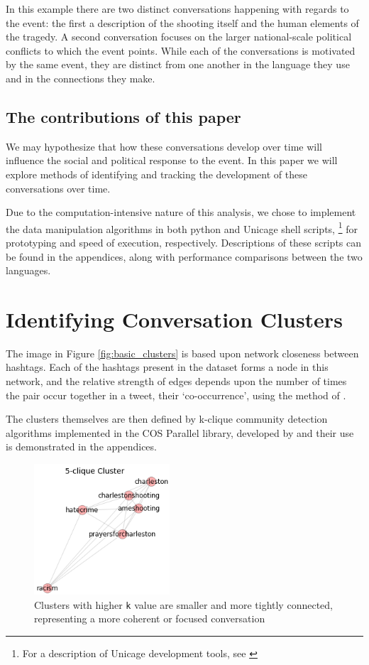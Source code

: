 \documentclass[12pt]{article}
\begin{document}
In this example there are two distinct conversations happening with regards to the event: the first a description of the shooting itself and the human elements of the tragedy. 
A second conversation focuses on the larger national-scale political conflicts to which the event points. 
While each of the conversations is motivated by the same event, they are distinct from one another in the language they use and in the connections they make.

\subsection{The contributions of this paper}
We may hypothesize that how these conversations develop over time will influence the social and political response to the event. 
In this paper we will explore methods of identifying and tracking the development of these conversations over time.

Due to the computation-intensive nature of this analysis, we chose to implement the data manipulation algorithms in both python and Unicage shell scripts, \footnote{For a description of Unicage development tools, see \cite{Tounaka2013}} for prototyping and speed of execution, respectively. 
Descriptions of these scripts can be found in the appendices, along with performance comparisons between the two languages.

\section{Identifying Conversation Clusters}
The image in Figure \ref{fig:basic_clusters} is based upon network closeness between hashtags. Each of the hashtags present in the dataset forms a node in this network, and the relative strength of edges depends upon the number of times the pair occur together in a tweet, their `co-occurrence', using the method of \cite{Marres}.

The clusters themselves are then defined by k-clique community detection algorithms implemented in the COS Parallel library, developed by \cite{Gregori2013} and their use is demonstrated in the appendices.

\begin{figure}[!ht]
  \centering
    \includegraphics[width=0.45\textwidth]{F3_5clique_clusters.png}
    \caption{Clusters with higher \texttt{k} value are smaller and  more tightly connected, representing a more coherent  or focused conversation}
  \label{fig:5clique}
\end{figure}
\end{document}
